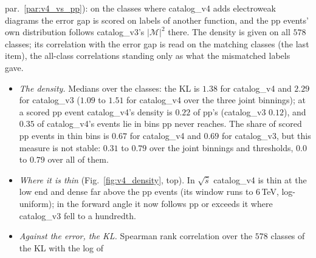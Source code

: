 \documentclass[11pt]{article}
\begin{document}
par.~\ref{par:v4_vs_pp}): on the classes where catalog\_v4 adds electroweak diagrams the error gap is scored on labels
of another function, and the pp events' own distribution follows catalog\_v3's $|\mathcal M|^2$ there. The density
is given on all $578$ classes; its correlation with the error gap is read on the matching classes (the last item),
the all-class correlations standing only as what the mismatched labels gave.
\begin{itemize}
  \item \emph{The density.} Medians over the classes: the KL is $1.38$ for catalog\_v4 and $2.29$ for catalog\_v3
    ($1.09$ to $1.51$ for catalog\_v4 over the three joint binnings); at a scored pp event catalog\_v4's density is
    $0.22$ of pp's (catalog\_v3 $0.12$), and $0.35$ of catalog\_v4's events lie in bins pp never reaches.
    The share of scored pp events in thin bins is $0.67$ for catalog\_v4 and $0.69$ for catalog\_v3, but this measure
    is not stable: $0.31$ to $0.79$ over the joint binnings and thresholds, $0.0$ to $0.79$ over all of them.
  \item \emph{Where it is thin} (Fig.~\ref{fig:v4_density}, top). In $\sqrt{\hat s}$ catalog\_v4 is thin at the low end
    and dense far above the pp events (its window runs to $6$\,TeV, log-uniform); in the forward angle it now follows pp
    or exceeds it where catalog\_v3 fell to a hundredth.
  \item \emph{Against the error, the KL.} Spearman rank correlation over the $578$ classes of the KL with the log of

\end{itemize}
\end{document}
